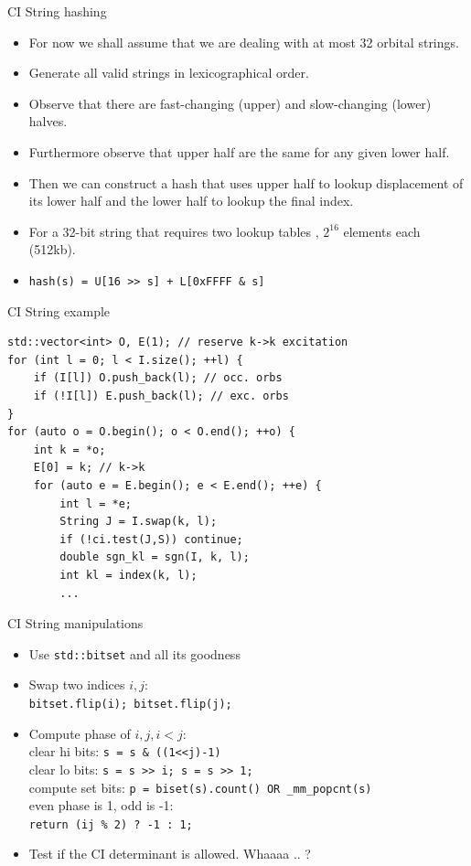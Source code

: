 \documentclass{beamer}
\begin{document}
\begin{frame}{CI String hashing}
\begin{itemize}
\item For now we shall assume that we are dealing with at most 32 orbital strings.
\item Generate all valid strings in lexicographical order.
\item Observe that there are fast-changing (upper) and slow-changing (lower) halves.
\item Furthermore observe that upper half are the same for any given lower half.
\item Then we can construct a hash that uses upper half to lookup displacement of its lower half
 and the lower half to lookup the final index.
\item For a 32-bit string that requires two lookup tables , $2^{16}$ elements each (512kb).
\item {\tt hash(s) = U[16 >> s] + L[0xFFFF  \& s]}
\end{itemize}
\end{frame}

\begin{frame}[fragile]{CI String example}
\begin{verbatim}
std::vector<int> O, E(1); // reserve k->k excitation
for (int l = 0; l < I.size(); ++l) {
    if (I[l]) O.push_back(l); // occ. orbs
    if (!I[l]) E.push_back(l); // exc. orbs
}
for (auto o = O.begin(); o < O.end(); ++o) {
    int k = *o;
    E[0] = k; // k->k
    for (auto e = E.begin(); e < E.end(); ++e) {
        int l = *e;
        String J = I.swap(k, l);
        if (!ci.test(J,S)) continue;
        double sgn_kl = sgn(I, k, l);
        int kl = index(k, l);
        ...
\end{verbatim}
\end{frame}

\begin{frame}{CI String manipulations}
\begin{itemize}
\item Use {\tt std::bitset} and all its goodness
\item Swap two indices $i,j$: \\
  {\tt bitset.flip(i); bitset.flip(j); }
\item Compute phase of $i,j, i < j$: \\
  clear hi bits: {\tt s = s \& ((1<<j)-1) } \\
  clear lo bits: {\tt s = s >> i; s = s >> 1; } \\
  compute set bits: {\tt p = biset(s).count() OR \_mm\_popcnt(s) } \\
  even phase is 1, odd is -1: \\
  {\tt return (ij \% 2) ? -1 : 1; }
\item Test if the CI determinant is allowed.  Whaaaa .. ?
\end{itemize}
\end{frame}
\end{document}
